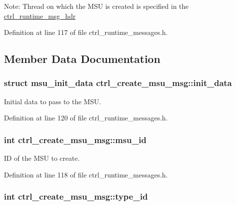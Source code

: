 Note\-: Thread on which the M\-S\-U is created is specified in the \hyperlink{structctrl__runtime__msg__hdr}{ctrl\-\_\-runtime\-\_\-msg\-\_\-hdr} 

Definition at line 117 of file ctrl\-\_\-runtime\-\_\-messages.\-h.



\subsection{Member Data Documentation}
\hypertarget{structctrl__create__msu__msg_acb66d3835b590481831542308c79cc93}{
\subsubsection[{init\-\_\-data}]{\setlength{\rightskip}{0pt plus 5cm}struct {\bf msu\-\_\-init\-\_\-data} ctrl\-\_\-create\-\_\-msu\-\_\-msg\-::init\-\_\-data}}\label{structctrl__create__msu__msg_acb66d3835b590481831542308c79cc93}


Initial data to pass to the M\-S\-U. 



Definition at line 120 of file ctrl\-\_\-runtime\-\_\-messages.\-h.

\hypertarget{structctrl__create__msu__msg_aec871367234b4ccbd2e60c0e15bc25f3}{
\subsubsection[{msu\-\_\-id}]{\setlength{\rightskip}{0pt plus 5cm}int ctrl\-\_\-create\-\_\-msu\-\_\-msg\-::msu\-\_\-id}}\label{structctrl__create__msu__msg_aec871367234b4ccbd2e60c0e15bc25f3}


I\-D of the M\-S\-U to create. 



Definition at line 118 of file ctrl\-\_\-runtime\-\_\-messages.\-h.

\hypertarget{structctrl__create__msu__msg_a18fff65123f61b0f764841d1e9363dcf}{
\subsubsection[{type\-\_\-id}]{\setlength{\rightskip}{0pt plus 5cm}int ctrl\-\_\-create\-\_\-msu\-\_\-msg\-::type\-\_\-id}}\label{structctrl__create__msu__msg_a18fff65123f61b0f764841d1e9363dcf}


